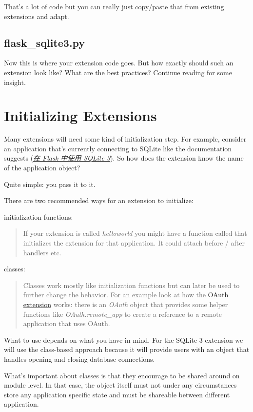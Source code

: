 \documentclass[a4paper,12pt]{sphinxmanual}
\begin{document}
That's a lot of code but you can really just copy/paste that from existing
extensions and adapt.


\subsection{flask\_sqlite3.py}
\label{extensiondev:flask-sqlite3-py}
Now this is where your extension code goes.  But how exactly should such
an extension look like?  What are the best practices?  Continue reading
for some insight.


\section{Initializing Extensions}
\label{extensiondev:initializing-extensions}
Many extensions will need some kind of initialization step.  For example,
consider an application that's currently connecting to SQLite like the
documentation suggests ({\hyperref[patterns/sqlite3:sqlite3]{\emph{在 Flask 中使用 SQLite 3}}}).  So how does the extension
know the name of the application object?

Quite simple: you pass it to it.

There are two recommended ways for an extension to initialize:

initialization functions:
\begin{quote}

If your extension is called \emph{helloworld} you might have a function
called  that initializes the
extension for that application.  It could attach before / after
handlers etc.
\end{quote}

classes:
\begin{quote}

Classes work mostly like initialization functions but can later be
used to further change the behavior.  For an example look at how the
\href{http://packages.python.org/Flask-OAuth/}{OAuth extension} works: there is an \emph{OAuth} object that provides
some helper functions like \emph{OAuth.remote\_app} to create a reference to
a remote application that uses OAuth.
\end{quote}

What to use depends on what you have in mind.  For the SQLite 3 extension
we will use the class-based approach because it will provide users with an
object that handles opening and closing database connections.

What's important about classes is that they encourage to be shared around
on module level.  In that case, the object itself must not under any
circumstances store any application specific state and must be shareable
between different application.
\end{document}
